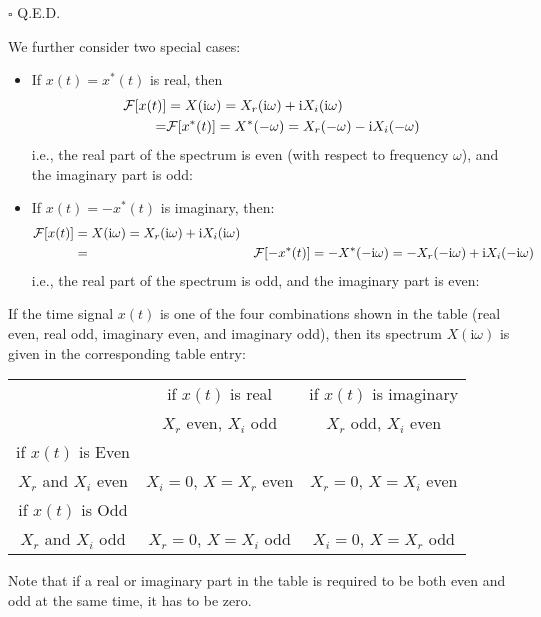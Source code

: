 \begin{itemize}
\begin{dem}
	\begin{flushright}
		$\square$  Q.E.D.
	\end{flushright}
	\end{dem}
	We further consider two special cases:
	\begin{itemize}
	\item If $x(t)=x^*(t)$ is real, then 
	\begin{eqnarray}
		{\cal F}[x(t)]&=X(\mathrm{i}\omega)=X_r(\mathrm{i}\omega)+\mathrm{i}X_i(\mathrm{i}\omega)	\nonumber \\
		=&{\cal F}[x^*(t)]=X^*(-\omega)=X_r(-\omega)-\mathrm{i}X_i(-\omega)	\nonumber 
	\end{eqnarray}
	i.e., the real part of the spectrum is even (with respect to frequency $\omega$),
	and the imaginary part is odd:
	
	\item If $x(t)=-x^*(t)$ is imaginary, then:
	\begin{eqnarray}
	{\cal F}[x(t)]&=X(\mathrm{i}\omega)=X_r(\mathrm{i}\omega)+\mathrm{i}X_i(\mathrm{i}\omega)  \nonumber \\
	&=&{\cal F}[-x^*(t)]=-X^*(-\mathrm{i}\omega)=-X_r(-\mathrm{i}\omega)+\mathrm{i}X_i(-\mathrm{i}\omega) \nonumber 
	\end{eqnarray}
	i.e., the real part of the spectrum is odd, and the imaginary part is even:
	
	\end{itemize}
	
	If the time signal $x(t)$ is one of the four combinations shown in the table (real even, real odd, imaginary even, and imaginary odd), then its spectrum $X(\mathrm{i}\omega)$ is given in the corresponding table entry:
	\vskip0.2in
	\begin{table}[H]
		\centering
		\begin{tabular}{c||c|c} \hline
			& if $x(t)$ is real		& if $x(t)$ is imaginary	\\ 
			& $X_r$ even, $X_i$ odd	& $X_r$ odd, $X_i$ even \\ \hline \hline
		if $x(t)$ is Even	&			&		\\
		$X_r$ and $X_i$ even	& $X_i=0$, $X=X_r$ even & $X_r=0$, $X=X_i$ even	\\ \hline
		if $x(t)$ is Odd	& 			&		\\
		$X_r$ and $X_i$ odd	& $X_r=0$, $X=X_i$ odd	& $X_i=0$, $X=X_r$ odd	\\ \hline
		\end{tabular}
	\end{table}
	Note that if a real or imaginary part in the table is required to be both even 
	and odd at the same time, it has to be zero.
	

\end{itemize}
